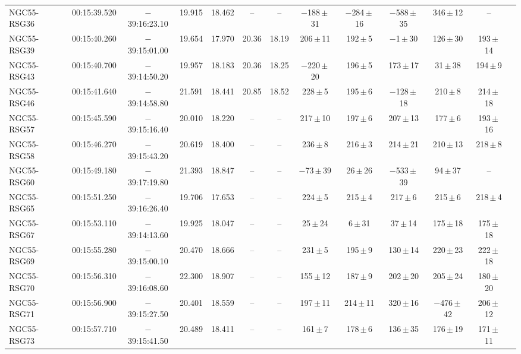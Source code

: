 \begin{table}
\begin{threeparttable}
\begin{tabular}{lcccccccccccl}
NGC55-RSG36 & 00:15:39.520 & $-$39:16:23.10& 19.915 & 18.462 & --   & --    &$-$188\,$\pm$\,31 &$-$284\,$\pm$\,16 & $-$588\,$\pm$\,35 &   346\,$\pm$\,12              & --             & \\
NGC55-RSG39 & 00:15:40.260 & $-$39:15:01.00& 19.654 & 17.970 &20.36 & 18.19 &   206\,$\pm$\,11 &  192\,$\pm$\,5&$-$1\,$\pm$\,30\tnote{c}& 126\,$\pm$\,30              & 193\,$\pm$\,14 & \\
NGC55-RSG43 & 00:15:40.700 & $-$39:14:50.20& 19.957 & 18.183 &20.36 & 18.25 &$-$220\,$\pm$\,20\tnote{c}&196\,$\pm$\,5& 173\,$\pm$\,17 &    31\,$\pm$\,38\tnote{c}     & 194\,$\pm$\,9  & \\
NGC55-RSG46 & 00:15:41.640 & $-$39:14:58.80& 21.591 & 18.441 &20.85 & 18.52 &   228\,$\pm$\,5  &  195\,$\pm$\,6   &  $-$128\,$\pm$\,18\tnote{c} &   210\,$\pm$\,8     & 214\,$\pm$\,18 & \\
NGC55-RSG57 & 00:15:45.590 & $-$39:15:16.40& 20.010 & 18.220 & --   & --    &   217\,$\pm$\,10 &  197\,$\pm$\,6   &     207\,$\pm$\,13 &   177\,$\pm$\,6              & 193\,$\pm$\,16 & \\
NGC55-RSG58 & 00:15:46.270 & $-$39:15:43.20& 20.619 & 18.400 & --   & --    &   236\,$\pm$\,8  &  216\,$\pm$\,3   &     214\,$\pm$\,21 &   210\,$\pm$\,13             & 218\,$\pm$\,8  & \\
NGC55-RSG60 & 00:15:49.180 & $-$39:17:19.80& 21.393 & 18.847 & --   & --    & $-$73\,$\pm$\,39 &   26\,$\pm$\,26  &  $-$533\,$\pm$\,39 &    94\,$\pm$\,37             & --             & \\
NGC55-RSG65 & 00:15:51.250 & $-$39:16:26.40& 19.706 & 17.653 & --   & --    &   224\,$\pm$\,5  &  215\,$\pm$\,4   &     217\,$\pm$\,6  &   215\,$\pm$\,6              & 218\,$\pm$\,4  & \\
NGC55-RSG67 & 00:15:53.110 & $-$39:14:13.60& 19.925 & 18.047 & --   & --    &25\,$\pm$\,24\tnote{c} & 6\,$\pm$\,31\tnote{c}&37\,$\pm$\,14\tnote{c} &175\,$\pm$\,18    & 175\,$\pm$\,18 & \\
NGC55-RSG69 & 00:15:55.280 & $-$39:15:00.10& 20.470 & 18.666 & --   & --    &   231\,$\pm$\,5  &  195\,$\pm$\,9   &130\,$\pm$\,14\tnote{c}&220\,$\pm$\,23             & 222\,$\pm$\,18 & \\
NGC55-RSG70 & 00:15:56.310 & $-$39:16:08.60& 22.300 & 18.907 & --   & --    &   155\,$\pm$\,12 &  187\,$\pm$\,9   &     202\,$\pm$\,20 &   205\,$\pm$\,24             & 180\,$\pm$\,20 & \\
NGC55-RSG71 & 00:15:56.900 & $-$39:15:27.50& 20.401 & 18.559 & --   & --    &   197\,$\pm$\,11 &  214\,$\pm$\,11  &320\,$\pm$\,16\tnote{c}&$-$476\,$\pm$\,42\tnote{c} & 206\,$\pm$\,12 & \\
NGC55-RSG73 & 00:15:57.710 & $-$39:15:41.50& 20.489 & 18.411 & --   & --    &   161\,$\pm$\,7  &  178\,$\pm$\,6   &     136\,$\pm$\,35 &   176\,$\pm$\,19             & 171\,$\pm$\,11 & \\


\end{tabular}
\end{threeparttable}
\end{table}
